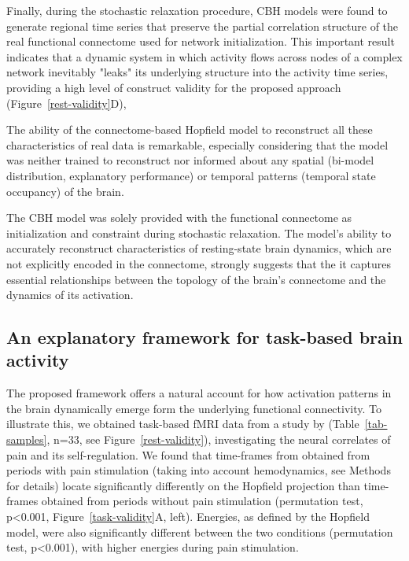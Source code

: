\documentclass{article}
\begin{document}
Finally, during the stochastic relaxation procedure, CBH models were found to generate regional time series that preserve the partial correlation structure of the real functional connectome used for network initialization.
This important result indicates that a dynamic system in which activity flows across nodes of a complex network inevitably "leaks" its underlying structure into the activity time series, providing a high level of construct validity for the proposed approach (Figure~\ref{rest-validity}D),

The ability of the connectome-based Hopfield model to reconstruct all these characteristics of real data is remarkable, especially considering that the model was neither trained to reconstruct nor informed about any spatial (bi-model distribution, explanatory performance) or temporal patterns (temporal state occupancy) of the brain.

The CBH model was solely provided with the functional connectome as initialization and constraint during stochastic relaxation. The model's ability to accurately reconstruct characteristics of resting-state brain dynamics, which are not explicitly encoded in the connectome, strongly suggests that the it captures essential relationships between the topology of the brain's connectome and the dynamics of its activation.

\subsection{An explanatory framework for task-based brain activity}\label{An explanatory framework for task-based brain activity}

The proposed framework offers a natural account for how activation patterns in the brain dynamically emerge form the underlying functional connectivity. To illustrate this, we obtained task-based fMRI data from a study by \href{https://doi.org/10.1371/journal.pbio.1002036}{} (Table~\ref{tab-samples}, n=33, see Figure~\ref{rest-validity}), investigating the neural correlates of pain and its self-regulation.
We found that time-frames from obtained from periods with pain stimulation (taking into account hemodynamics, see Methods for details) locate significantly differently on the Hopfield projection than time-frames obtained from periods without pain stimulation (permutation test, p\textless 0.001, Figure~\ref{task-validity}A, left).
Energies, as defined by the Hopfield model, were also significantly different between the two conditions (permutation test, p\textless 0.001), with higher energies during pain stimulation.
\end{document}
